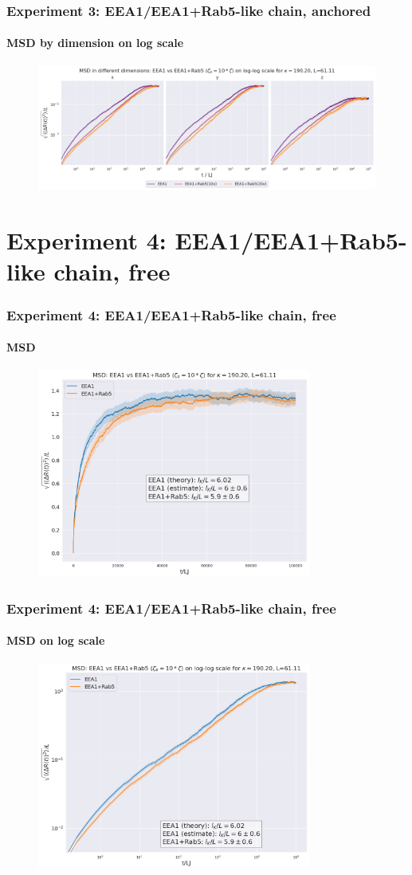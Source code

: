 \documentclass[handout]{beamer}
\begin{document}
\begin{frame}
    \frametitle{Experiment 3: EEA1/EEA1+Rab5-like chain, anchored}
    \framesubtitle{MSD by dimension on log scale}
    \begin{figure}[h]
        \includegraphics[width=11.2cm]{./14+15+16-exp-msd-dim-log.png}
    \end{figure}
\end{frame}

\section{Experiment 4: EEA1/EEA1+Rab5-like chain, free}

\begin{frame}
    \frametitle{Experiment 4: EEA1/EEA1+Rab5-like chain, free}
    \framesubtitle{MSD}
    \begin{figure}[h]
        \includegraphics[width=9cm]{./17-exp-msd.png}
    \end{figure}
\end{frame}

\begin{frame}
    \frametitle{Experiment 4: EEA1/EEA1+Rab5-like chain, free}
    \framesubtitle{MSD on log scale}
    \begin{figure}[h]
        \includegraphics[width=9cm]{./17-exp-msd-log.png}
    \end{figure}
\end{frame}
\end{document}
